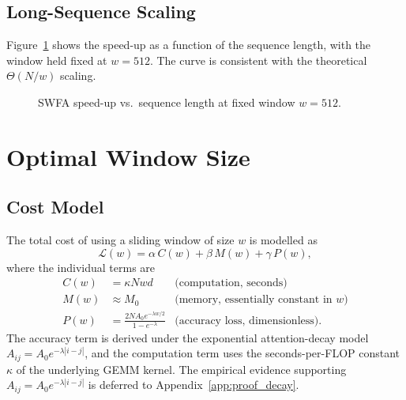 \subsection{Long-Sequence Scaling}\label{sec:swfa_long_seq}
Figure~\ref{fig:swfa_scale} shows the speed-up as a function of
the sequence length, with the window held fixed at $w = 512$.
The curve is consistent with the theoretical $\Theta(N/w)$
scaling.

\begin{figure}[H]
\centering
{}
\caption{SWFA speed-up vs.\ sequence length at fixed window
         $w{=}512$.}
\label{fig:swfa_scale}
\end{figure}

\section{Optimal Window Size}\label{sec:swfa_optimal}

\subsection{Cost Model}\label{sec:swfa_cost}
The total cost of using a sliding window of size $w$ is modelled
as
\begin{equation}\label{eq:loss}
\mathcal{L}(w) = \alpha\, C(w) + \beta\, M(w) + \gamma\, P(w),
\end{equation}
where the individual terms are
\begin{align*}
C(w) &= \kappa N w d & \text{(computation, seconds)} \\
M(w) &\approx M_0    & \text{(memory, essentially constant in $w$)} \\
P(w) &= \frac{2 N A_0 e^{-\lambda w/2}}{1 - e^{-\lambda}}
                    & \text{(accuracy loss, dimensionless)}.
\end{align*}
The accuracy term is derived under the exponential attention-decay
model $A_{ij} = A_0 e^{-\lambda|i-j|}$, and the computation term
uses the seconds-per-FLOP constant $\kappa$ of the underlying GEMM
kernel. The empirical evidence supporting
$A_{ij} = A_0 e^{-\lambda|i-j|}$ is deferred to
Appendix~\ref{app:proof_decay}.

